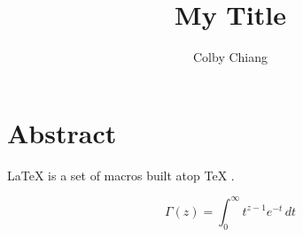 \documentclass[a4paper,10pt]{article}
\title{My Title}
\author{Colby Chiang}
\begin{document}
\maketitle

\section{Abstract}
\LaTeX{} \citep{latex2e} is a set of macros built atop
\TeX{} \citep{texbook}.

\lipsum[1]

\begin{equation}
    \Gamma(z) = \int_0^\infty t^{z-1} e^{-t}\,dt
\end{equation}

\lipsum[2]

\clearpage
\newpage


\end{document}
